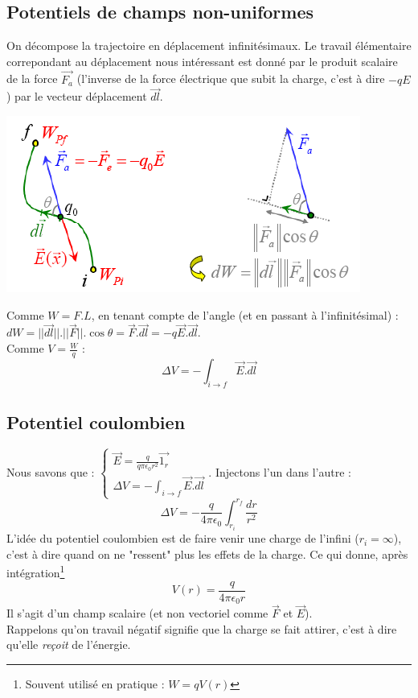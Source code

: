 \documentclass	[11pt, a4paper, openany]{book}
\begin{document}
\subsection{Potentiels de champs non-uniformes}
On décompose la trajectoire en déplacement infinitésimaux. Le travail élémentaire correpondant au déplacement nous intéressant est donné par le produit scalaire de la force $\vec{F_a}$ (l'inverse de la force électrique que subit la charge, c'est à dire $-qE$) par le vecteur déplacement $\vec{dl}$.
\begin{center}
	\includegraphics[scale=0.6]{es/image9.png}
\end{center}
Comme $W = F.L$, en tenant compte de l'angle (et en passant à l'infinitésimal) : $dW = ||\vec{dl}||.||\vec{F}||.\cos\theta = \vec{F}.\vec{dl} = -q\vec{E}.\vec{dl}$.\\
Comme $V = \frac{W}{q}$ :
\begin{equation}
	\Delta V = - \int_{i \rightarrow f} \vec{E}.\vec{dl}
\end{equation}

\subsection{Potentiel coulombien}
Nous savons que : $\left\{\begin{array}{l}
\vec{E} = \frac{q}{q\pi \epsilon_0 r^2}\vec{1_r}\\
\Delta V = - \int_{i \rightarrow f} \vec{E}.\vec{dl}
\end{array}\right.$. Injectons l'un dans l'autre :
\begin{equation}
	\Delta V = -\frac{q}{4\pi \epsilon_0}\int_{r_i}^{r_f} \frac{dr}{r^2}
\end{equation}
L'idée du potentiel coulombien est de faire venir une charge de l'infini ($r_i = \infty$), c'est à dire quand on ne "ressent" plus les effets de la charge. Ce qui donne, après intégration\footnote{Souvent utilisé en pratique : $W = qV(r)$}
\begin{equation}
	V(r) = \frac{q}{4\pi \epsilon_0 r}
\end{equation}
Il s'agit d'un champ scalaire (et non vectoriel comme $\vec{F}$ et $\vec E$).\\
Rappelons qu'on travail négatif signifie que la charge se fait attirer, c'est à dire qu'elle \textit{reçoit} de l'énergie.
\end{document}
